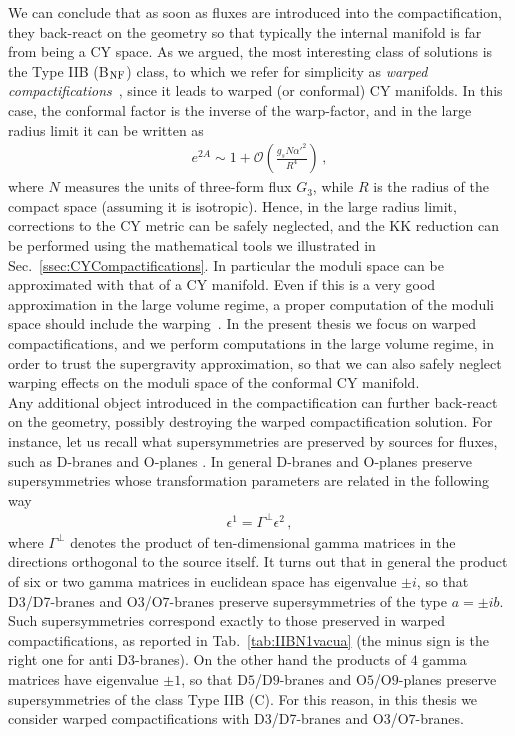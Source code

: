 \documentclass[12pt,a4paper]{book}
\begin{document}
We can conclude that as soon as fluxes are introduced into the compactification, they back-react on the geometry so that typically the internal manifold is far from being a CY space. As we argued, the most interesting class of solutions is the Type IIB (B$_{\rm NF}$) class, to which we refer for simplicity as \textit{warped compactifications}~\cite{Giddings:2001yu, Curio:2000dw, Gubser:2000vg, Grana:2000jj, DeWolfe:2002nn, Frey:2003tf}, since it leads to warped (or conformal) CY manifolds. In this case, the conformal factor is the inverse of the warp-factor, and in the large radius limit it can be written as
\begin{align}
\label{eq:ConformalFactorLimit}
e^{2 A} \sim 1 + \mathcal{O}\left(\frac{g_s N \alpha'^{2}}{R^4}\right) \,,
\end{align}
where $N$ measures the units of three-form flux $G_3$, while $R$ is the radius of the compact space (assuming it is isotropic). Hence, in the large radius limit, corrections to the CY metric can be safely neglected, and the KK reduction can be performed using the mathematical tools we illustrated in Sec.~\ref{ssec:CYCompactifications}. In particular the moduli space can be approximated with that of a CY manifold. Even if this is a very good approximation in the large volume regime, a proper computation of the moduli space should include the warping~\cite{Giddings:2005ff, deAlwis:2003sn, Shiu:2008ry, Douglas:2008jx, Frey:2008xw, Chen:2009zi, Underwood:2010pm, Frey:2013bha, Martucci:2014ska}. In the present thesis we focus on warped compactifications, and we perform computations in the large volume regime, in order to trust the supergravity approximation, so that we can also safely neglect warping effects on the moduli space of the conformal CY manifold.\\

Any additional object introduced in the compactification can further back-react on the geometry, possibly destroying the warped compactification solution. For instance, let us recall what supersymmetries are preserved by sources for fluxes, such as D-branes and O-planes \cite{Polchinski:1998rr}. In general D-branes and O-planes preserve supersymmetries whose transformation parameters are related in the following way
\begin{align}
\label{eq:DbranesSUSY}
\epsilon^1 = \Gamma^\perp \epsilon^2\,,
\end{align}
where $\Gamma^\perp$ denotes the product of ten-dimensional gamma matrices in the directions orthogonal to the source itself. It turns out that in general the product of six or two gamma matrices in euclidean space has eigenvalue $\pm i$, so that D3/D7-branes and O$3$/O$7$-branes preserve supersymmetries of the type $a = \pm ib$. Such supersymmetries correspond exactly to those preserved in warped compactifications, as reported in Tab.~\ref{tab:IIBN1vacua} (the minus sign is the right one for anti D3-branes). On the other hand the products of $4$ gamma matrices have eigenvalue $\pm 1$, so that D$5$/D$9$-branes and O$5$/O$9$-planes preserve supersymmetries of the class Type IIB (C). For this reason, in this thesis we consider warped compactifications with D3/D7-branes and O$3$/O$7$-branes.
\end{document}
